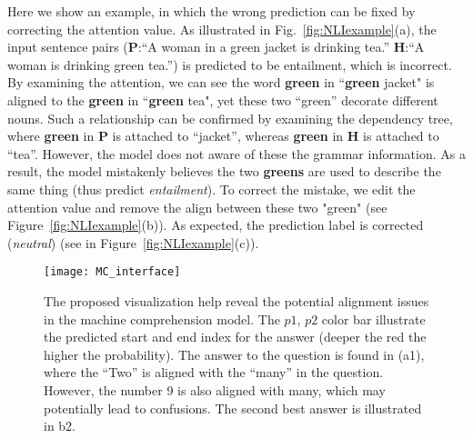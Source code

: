 Here we show an example, in which the wrong prediction can be fixed by correcting the attention value.  
%
As illustrated in Fig.~\ref{fig:NLIexample}(a), the input sentence pairs (\textbf{P}:``A woman in a green jacket is drinking tea.'' \textbf{H}:``A woman is drinking green tea.'') is predicted to be entailment, which is incorrect.
By examining the attention, we can see the word \textbf{green} in ``\textbf{green} jacket" is aligned to the \textbf{green} in ``\textbf{green} tea", yet these two ``green'' decorate different nouns. Such a relationship can be confirmed by examining the dependency tree, where  \textbf{green} in \textbf{P} is attached to ``jacket'', whereas \textbf{green} in \textbf{H} is attached to ``tea''. However, the model does not aware of these the grammar information. As a result, the model mistakenly believes the two \textbf{greens} are used to describe the same thing (thus predict \emph{entailment}). 
%
To correct the mistake, we edit the attention value and remove the align between these two "green" (see Figure~\ref{fig:NLIexample}(b)).
As expected, the prediction label is corrected (\emph{neutral}) (see in Figure~\ref{fig:NLIexample}(c)).

\begin{figure*}[t]
\centering
\vspace{-2mm}
 \texttt{[image: MC\_interface]}
  \vspace{-6mm}
 \caption{
The proposed visualization help reveal the potential alignment issues in the machine comprehension model.
The $p1$, $p2$ color bar illustrate the predicted start and end index for the answer (deeper the red the higher the probability).
The answer to the question is found in (a1), where the ``Two'' is aligned with the ``many'' in the question. However, the number 9 is also aligned with many, which may potentially lead to confusions.
The second best answer is illustrated in b2.
}
\label{fig:MCexample}
\end{figure*}

